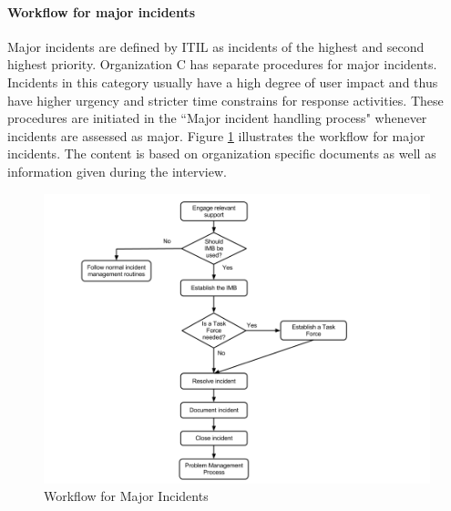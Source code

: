 \paragraph{Workflow for major incidents}
Major incidents are defined by ITIL as incidents of the highest and second highest priority. Organization C has separate procedures for major incidents. Incidents in this category usually have a high degree of user impact and thus have higher urgency and stricter time constrains for response activities. These procedures are initiated in the ``Major incident handling process" whenever incidents are assessed as major. Figure \ref{fig:workflowcaseCmajor} illustrates the workflow for major incidents. The content is based on organization specific documents as well as information given during the interview.

\begin{figure}[H]
\hspace{-1.1cm}\includegraphics[scale=0.53]{WorkflowcaseCMAJOR.png}
\caption[Workflow for Major Incidents, Case C]{Workflow for Major Incidents}
\label{fig:workflowcaseCmajor}
\end{figure}

